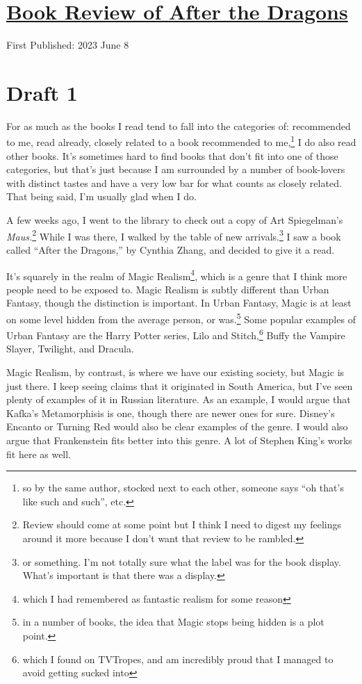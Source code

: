 \documentclass[12pt]{article}[titlepage]
\newcommand{\say}[1]{``#1''}
\newcommand{\1}{\={a}}
\newcommand{\2}{\={e}}
\newcommand{\3}{\={\i}}
\newcommand{\4}{\=o}
\newcommand{\5}{\=u}
\newcommand{\6}{\={A}}
\renewcommand{\,}{\textsuperscript{,}}
\begin{document}
\doublespacing
\section{\href{book-review-after-dragons.html}{Book Review of After the Dragons}}
First Published: 2023 June 8
\section{Draft 1}
For as much as the books I read tend to fall into the categories of: recommended to me, read already, closely related to a book recommended to me,\footnote{so by the same author, stocked next to each other, someone says \say{oh that's like such and such}, etc.} I do also read other books.
It's sometimes hard to find books that don't fit into one of those categories, but that's just because I am surrounded by a number of book-lovers with distinct tastes and have a very low bar for what counts as closely related.
That being said, I'm usually glad when I do.

A few weeks ago, I went to the library to check out a copy of Art Spiegelman's \textit{Maus.}\footnote{Review should come at some point but I think I need to digest my feelings around it more because I don't want that review to be rambled.}
While I was there, I walked by the table of new arrivals.\footnote{or something. I'm not totally sure what the label was for the book display. What's important is that there was a display.}
I saw a book called \say{After the Dragons,} by Cynthia Zhang, and decided to give it a read.

It's squarely in the realm of Magic Realism\footnote{which I had remembered as fantastic realism for some reason}, which is a genre that I think more people need to be exposed to.
Magic Realism is subtly different than Urban Fantasy, though the distinction is important.
In Urban Fantasy, Magic is at least on some level hidden from the average person, or was.\footnote{in a number of books, the idea that Magic stops being hidden is a plot point.}
Some popular examples of Urban Fantasy are the Harry Potter series, Lilo and Stitch,\footnote{which I found on TVTropes, and am incredibly proud that I managed to avoid getting sucked into} Buffy the Vampire Slayer, Twilight, and Dracula.

Magic Realism, by contrast, is where we have our existing society, but Magic is just there.
I keep seeing claims that it originated in South America, but I've seen plenty of examples of it in Russian literature.
As an example, I would argue that Kafka's Metamorphisis is one, though there are newer ones for sure.
Disney's Encanto or Turning Red would also be clear examples of the genre.
I would also argue that Frankenstein fits better into this genre.
A lot of Stephen King's works fit here as well.
\end{document}
